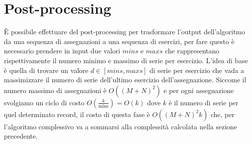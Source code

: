 \documentclass{article}
\begin{document}
\section{Post-processing}
È possibile effettuare del post-processing per trasformare l'output
dell'algoritmo da una sequenza di assegnazioni a una sequenza di esercizi, per
fare questo è necessario prendere in input due valori $mins$ e $maxs$ che
rappresentano rispettivamente il numero minimo e massimo di serie per esercizio.
L'idea di base è quella di trovare un valore $d \in [mins, maxs]$ di serie per
esercizio che vada a massimizzare il numero di serie dell'ultimo esercizio
dell'assegnazione. Siccome il numero massimo di assegnazioni è $O((M+N)^2)$ e
per ogni assegnazione svolgiamo un ciclo di costo
$O(\frac{k}{\text{mins}}) = O(k)$ dove $k$ è il numero di serie per quel
determinato record, il costo di questa fase è $O((M+N)^2k)$ che, per l'algoritmo
complessivo va a sommarsi alla complessità calcolata nella sezione precedente.
\end{document}

